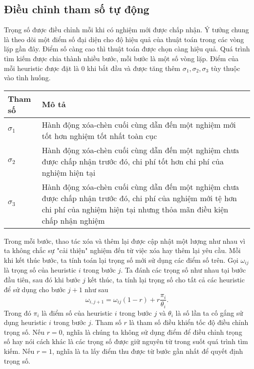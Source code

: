 \subsection{Điều chỉnh tham số tự động}
Trọng số được điều chỉnh mỗi khi có nghiệm mới được chấp nhận. Ý tưởng chung là theo dõi một điểm số đại diện cho độ hiệu quả của thuật toán trong các vòng lặp gần đây. Điểm số càng cao thì thuật toán được chọn càng hiệu quả. Quá trình tìm kiếm được chia thành nhiều bước, mỗi bước là một số vòng lặp. Điểm của mỗi heuristic được đặt là $0$ khi bắt đầu và được tăng thêm $\sigma_1, \sigma_2, \sigma_3$ tùy thuộc vào tình huống.
\begin{table}[caption={Tham số cập nhật trọng số}, label=tab:weight]
	\begin{tabularx}{\textwidth}{|l|X|}
		\hline
		Tham số    & Mô tả  \\ \hline
		$\sigma_1$ & Hành động xóa-chèn cuối cùng dẫn đến một nghiệm mới tốt hơn nghiệm tốt nhất toàn cục \\ \hline
		$\sigma_2$ & Hành động xóa-chèn cuối cùng dẫn đến một nghiệm chưa được chấp nhận trước đó, chi phí tốt hơn chi phí của nghiệm hiện tại \\ \hline
		$\sigma_3$ & Hành động xóa-chèn cuối cùng dẫn đến một nghiệm chưa được chấp nhận trước đó, chi phí của nghiệm mới tệ hơn chi phí của nghiệm hiện tại nhưng thỏa mãn điều kiện chấp nhận nghiệm \\ \hline
	\end{tabularx}
\end{table}

Trong mỗi bước, thao tác xóa và thêm lại được cập nhật một lượng như nhau vì ta không chắc sự "cải thiện" nghiệm đến từ việc xóa hay thêm lại yêu cầu. Mỗi khi kết thúc bước, ta tính toán lại trọng số mới sử dụng các điểm số trên. Gọi $\omega_{ij}$ là trọng số của heuristic $i$ trong bước $j$. Ta đánh các trọng số như nhau tại bước đầu tiên, sau đó khi bước $j$ kết thúc, ta tính lại trọng số cho tất cả các heuristic để sử dụng cho bước $j+1$ như sau
\begin{equation}
	\label{eq:adaptive_weight}
	\omega_{i, j+1} = \omega_{ij}(1-r)+r\frac{\pi_i}{\theta_i}.
\end{equation}
Trong đó $\pi_i$ là điểm số của heuristic $i$ trong bước $j$ và $\theta_i$ là số lần ta cố gắng sử dụng heuristic $i$ trong bước $j$. Tham số $r$ là tham số điều khiển tốc độ điều chỉnh trọng số. Nếu $r=0$, nghĩa là chúng ta không sử dụng điểm để điều chỉnh trọng số hay nói cách khác là các trọng số được giữ nguyên từ trong suốt quá trình tìm kiếm. Nếu $r=1$, nghĩa là ta lấy điểm thu được từ bước gần nhất để quyết định trọng số.


